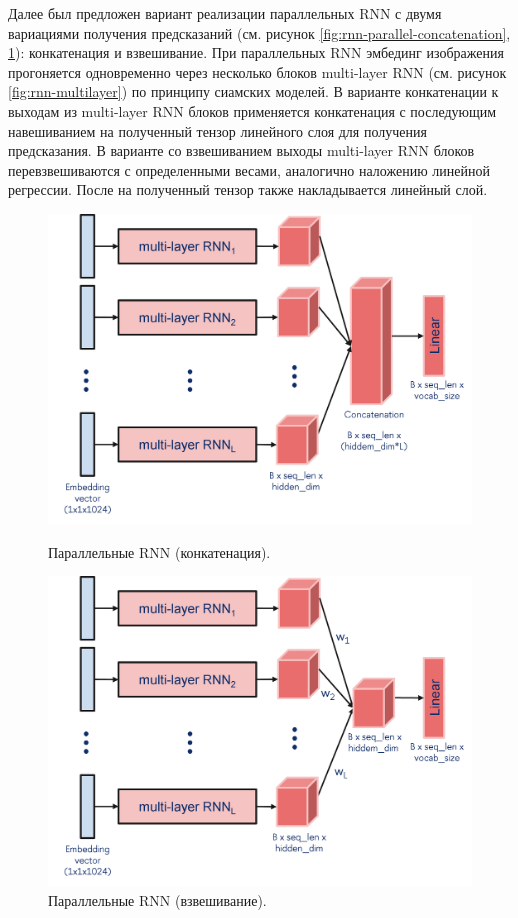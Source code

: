 \documentclass[a4paper,12pt]{extarticle}
\begin{document}
Далее был предложен вариант реализации параллельных RNN с двумя вариациями получения предсказаний (см. рисунок \ref{fig:rnn-parallel-concatenation}, \ref{fig:rnn-parallel-weighted}): конкатенация и взвешивание. При параллельных RNN эмбединг изображения прогоняется одновременно через несколько блоков multi-layer RNN (см. рисунок \ref{fig:rnn-multilayer}) по принципу сиамских моделей. В варианте конкатенации к выходам из multi-layer RNN блоков применяется конкатенация с последующим навешиванием на полученный тензор линейного слоя для получения предсказания. В варианте со взвешиванием выходы multi-layer RNN блоков перевзвешиваются с определенными весами, аналогично наложению линейной регрессии. После на полученный тензор также накладывается линейный слой.
\begin{figure}[ht]
\begin{minipage}[b]{3in}
	\includegraphics[scale=0.5]{rnn-parallel-concatenation.png}
	\caption{Параллельные RNN (конкатенация).}
	\label{fig:rnn-parallel-concatenation}
\end{minipage}
\hfill
\begin{minipage}[b]{3in}
	\includegraphics[scale=0.5]{rnn-parallel-weighted.png}
	\caption{Параллельные RNN (взвешивание).}
	\label{fig:rnn-parallel-weighted}
\end{minipage}
\end{figure}
\end{document}

